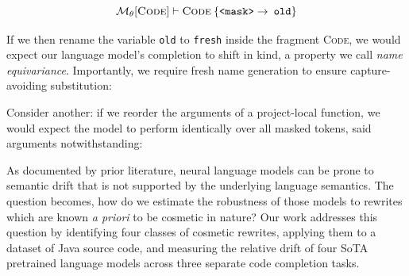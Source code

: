 \documentclass[usenames,dvipsnames]{article} %
\begin{document}
  \begin{equation}
    \mathcal{M}_\theta[\textsc{Code}] \vdash \textsc{Code}\:\{\texttt{<mask>} \rightarrow \:\texttt{old}\}
  \end{equation}

  If we then rename the variable \texttt{old} to \texttt{fresh} inside the fragment \textsc{Code}, we would expect our language model's completion to shift in kind, a property we call \textit{name equivariance}. Importantly, we require fresh name generation to ensure capture-avoiding substitution:

  \begin{center}
    \begin{prooftree}
    \end{prooftree}
  \end{center}

  Consider another: if we reorder the arguments of a project-local function, we would expect the model to perform identically over all masked tokens, said arguments notwithstanding:

  \begin{center}
    \begin{prooftree}
    \end{prooftree}
  \end{center}

As documented by prior literature, neural language models can be prone to semantic drift that is not supported by the underlying language semantics. The question becomes, how do we estimate the robustness of those models to rewrites which are known \textit{a priori} to be cosmetic in nature? Our work addresses this question by identifying four classes of cosmetic rewrites, applying them to a dataset of Java source code, and measuring the relative drift of four SoTA pretrained language models across three separate code completion tasks.
\end{document}
